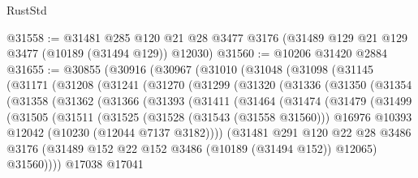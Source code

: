 \begin{lexlean}{RustStd}
\begin{coremodule}
@31558 := @31481
    @285
    @120
    @21
    @28
    @3477
    @3176
    (@31489 @129 @21 @129 @3477 (@10189 (@31494 @129)) @12030)
@31560 := @10206 @31420 @2884
@31655 := @30855
    (@30916
      (@30967
        (@31010
          (@31048
            (@31098
              (@31145
                (@31171
                  (@31208
                    (@31241
                      (@31270
                        (@31299
                          (@31320
                            (@31336
                              (@31350
                                (@31354
                                  (@31358
                                    (@31362
                                      (@31366
                                        (@31393
                                          (@31411
                                            (@31464
                                              (@31474
                                                (@31479
                                                  (@31499
                                                    (@31505
                                                      (@31511
                                                        (@31525
                                                          (@31528 (@31543 (@31558 @31560)))
                                                          @16976
                                                          @10393
                                                          @12042
                                                          (@10230 (@12044 @7137 @3182))))
                                                      (@31481
                                                        @291
                                                        @120
                                                        @22
                                                        @28
                                                        @3486
                                                        @3176
                                                        (@31489
                                                          @152
                                                          @22
                                                          @152
                                                          @3486
                                                          (@10189 (@31494 @152))
                                                          @12065)
                                                        @31560))))
                                                @17038
                                                @17041

\end{coremodule}
\end{lexlean}
